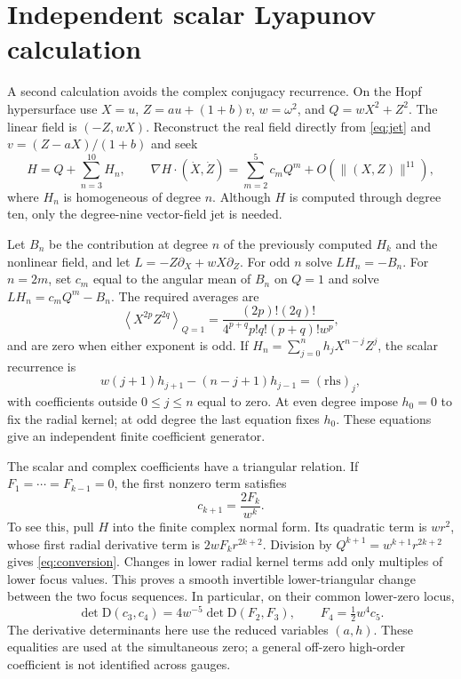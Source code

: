 \documentclass[11pt,a4paper]{article}
\theoremstyle{remark}
\newcommand{\D}{\mathrm D}
\numberwithin{equation}{section}
\begin{document}
\appendix
\section{Independent scalar Lyapunov calculation}\label{app:independent}
A second calculation avoids the complex conjugacy recurrence. On the
Hopf hypersurface use $X=u$, $Z=au+(1+b)v$, $w=\omega^2$, and
$Q=wX^2+Z^2$. The linear field is $(-Z,wX)$. Reconstruct the real
field directly from \eqref{eq:jet} and $v=(Z-aX)/(1+b)$ and seek
\begin{equation}\label{eq:lyapunov}
 H=Q+\sum_{n=3}^{10}H_n,\qquad
 \nabla H\cdot(\dot X,\dot Z)=\sum_{m=2}^5 c_m Q^m
                                    +O(\|(X,Z)\|^{11}),
\end{equation}
where $H_n$ is homogeneous of degree $n$. Although $H$ is computed
through degree ten, only the degree-nine vector-field jet is needed.

Let $B_n$ be the contribution at degree $n$ of the previously computed
$H_k$ and the nonlinear field, and let
$L=-Z\partial_X+wX\partial_Z$. For odd $n$ solve $LH_n=-B_n$.
For $n=2m$, set $c_m$ equal to the angular mean of $B_n$ on $Q=1$
and solve $LH_n=c_mQ^m-B_n$. The required averages are
\begin{equation}\label{eq:average}
 \left\langle X^{2p}Z^{2q}\right\rangle_{Q=1}
 =\frac{(2p)!(2q)!}{4^{p+q}p!q!(p+q)!w^p},
\end{equation}
and are zero when either exponent is odd. If
$H_n=\sum_{j=0}^n h_jX^{n-j}Z^j$, the scalar recurrence is
\begin{equation}\label{eq:scalar}
 w(j+1)h_{j+1}-(n-j+1)h_{j-1}=(\mathrm{rhs})_j,
\end{equation}
with coefficients outside $0\leq j\leq n$ equal to zero. At even
degree impose $h_0=0$ to fix the radial kernel; at odd degree the
last equation fixes $h_0$. These equations give an independent
finite coefficient generator.

The scalar and complex coefficients have a triangular relation. If
$F_1=\cdots=F_{k-1}=0$, the first nonzero term satisfies
\begin{equation}\label{eq:conversion}
 c_{k+1}=\frac{2F_k}{w^k}.
\end{equation}
To see this, pull $H$ into the finite complex normal form. Its
quadratic term is $wr^2$, whose first radial derivative term is
$2wF_kr^{2k+2}$. Division by $Q^{k+1}=w^{k+1}r^{2k+2}$ gives
\eqref{eq:conversion}. Changes in lower radial kernel terms add
only multiples of lower focus values. This proves a smooth
invertible lower-triangular change between the two focus sequences.
In particular, on their common lower-zero locus,
\begin{equation}\label{eq:detconversion}
 \det\D(c_3,c_4)=4w^{-5}\det\D(F_2,F_3),\qquad
 F_4=\tfrac12w^4c_5.
\end{equation}
The derivative determinants here use the reduced variables $(a,h)$.
These equalities are used at the simultaneous zero; a general
off-zero high-order coefficient is not identified across gauges.
\end{document}
